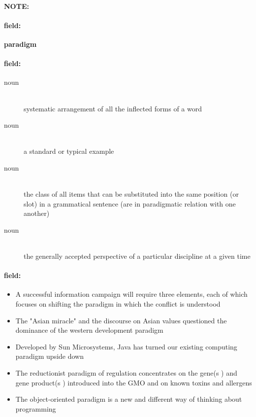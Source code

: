\documentclass[12pt]{article}
\newenvironment{note}{\paragraph{NOTE:}}{}
\newenvironment{field}{\paragraph{field:}}{}
\begin{document}
\begin{note}
\begin{field}
\textbf{\large paradigm}
\end{field}


\begin{field}
\begin{description}
\item[noun] \hfill \\ 
systematic arrangement of all the inflected forms of a word

\item[noun] \hfill \\ 
a standard or typical example

\item[noun] \hfill \\ 
the class of all items that can be substituted into the same position (or slot) in a grammatical sentence (are in paradigmatic relation with one another)

\item[noun] \hfill \\ 
the generally accepted perspective of a particular discipline at a given time

\end{description}
\end{field}

\begin{field}
\begin{itemize}
\item A successful information campaign will require three elements, each of which focuses on shifting the paradigm in which the conflict is understood
\item The "Asian miracle" and the discourse on Asian values questioned the dominance of the western development paradigm
\item Developed by Sun Microsystems, Java has turned our existing computing paradigm upside down
\item The reductionist paradigm of regulation concentrates on the gene(s ) and gene product(s ) introduced into the GMO and on known toxins and allergens
\item The object-oriented paradigm is a new and different way of thinking about programming
\end{itemize}
\end{field}
\end{note}
\end{document}
